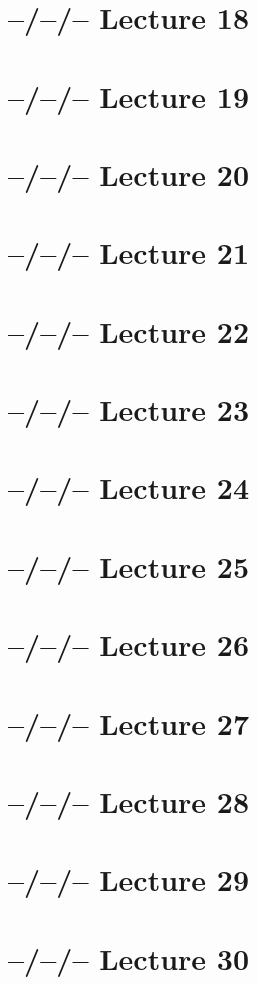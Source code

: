 \documentclass{article}
\theoremstyle{definition}
\begin{document}
\section{--/--/-- Lecture 18}

\section{--/--/-- Lecture 19}

\section{--/--/-- Lecture 20}

\section{--/--/-- Lecture 21}

\section{--/--/-- Lecture 22}

\section{--/--/-- Lecture 23}

\section{--/--/-- Lecture 24}

\section{--/--/-- Lecture 25}

\section{--/--/-- Lecture 26}

\section{--/--/-- Lecture 27}

\section{--/--/-- Lecture 28}

\section{--/--/-- Lecture 29}

\section{--/--/-- Lecture 30}
\end{document}
